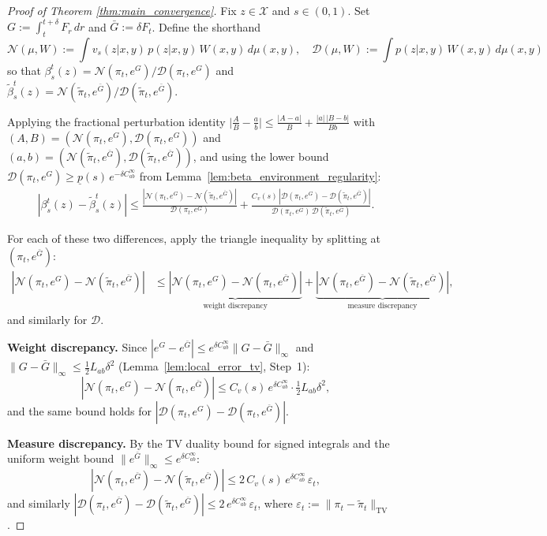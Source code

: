 \documentclass[11pt]{article}
\theoremstyle{definition}
\numberwithin{equation}{section}%
\begin{document}
\begin{proof}[Proof of Theorem \ref{thm:main_convergence}]
Fix $z \in \mathcal{X}$ and $s \in (0,1)$. Set $G := \int_t^{t+\delta} F_r\,dr$ and $\bar{G} := \delta F_t$. Define the shorthand
\[
    \mathcal{N}(\mu, W) := \int v_s(z|x,y)\,p(z|x,y)\,W(x,y)\,d\mu(x,y), \quad
    \mathcal{D}(\mu, W) := \int p(z|x,y)\,W(x,y)\,d\mu(x,y)
\]
so that $\beta_s^t(z) = \mathcal{N}(\pi_t, e^G)/\mathcal{D}(\pi_t, e^G)$ and $\tilde{\beta}_s^t(z) = \mathcal{N}(\tilde{\pi}_t, e^{\bar{G}})/\mathcal{D}(\tilde{\pi}_t, e^{\bar{G}})$.

Applying the fractional perturbation identity $\bigl|\tfrac{A}{B} - \tfrac{a}{b}\bigr| \le \tfrac{|A-a|}{B} + \tfrac{|a|\,|B-b|}{Bb}$ with
$(A,B) = (\mathcal{N}(\pi_t,e^G), \mathcal{D}(\pi_t,e^G))$ and $(a,b) = (\mathcal{N}(\tilde{\pi}_t,e^{\bar{G}}), \mathcal{D}(\tilde{\pi}_t,e^{\bar{G}}))$, and using the lower bound $\mathcal{D}(\pi_t, e^G) \ge \underline{p}(s)\,e^{-\delta C_{ab}^\infty}$ from Lemma~\ref{lem:beta_environment_regularity}:
\begin{align*}
|\beta_s^t(z) - \tilde{\beta}_s^t(z)|
\le \frac{|\mathcal{N}(\pi_t,e^G) - \mathcal{N}(\tilde{\pi}_t,e^{\bar{G}})|}{\mathcal{D}(\pi_t,e^G)}
+ \frac{C_v(s)\,|\mathcal{D}(\pi_t,e^G) - \mathcal{D}(\tilde{\pi}_t,e^{\bar{G}})|}{\mathcal{D}(\pi_t,e^G)\,\mathcal{D}(\tilde{\pi}_t,e^{\bar{G}})}.
\end{align*}

For each of these two differences, apply the triangle inequality by splitting at $(\pi_t, e^{\bar{G}})$:
\begin{align*}
|\mathcal{N}(\pi_t,e^G) - \mathcal{N}(\tilde{\pi}_t,e^{\bar{G}})| &\le
\underbrace{|\mathcal{N}(\pi_t,e^G) - \mathcal{N}(\pi_t,e^{\bar{G}})|}_{\text{weight discrepancy}} +
\underbrace{|\mathcal{N}(\pi_t,e^{\bar{G}}) - \mathcal{N}(\tilde{\pi}_t,e^{\bar{G}})|}_{\text{measure discrepancy}},
\end{align*}
and similarly for $\mathcal{D}$.

\textbf{Weight discrepancy.} Since $|e^G - e^{\bar{G}}| \le e^{\delta C_{ab}^\infty}\|G - \bar{G}\|_\infty$ and $\|G - \bar{G}\|_\infty \le \tfrac{1}{2}L_{ab}\delta^2$ (Lemma~\ref{lem:local_error_tv}, Step~1):
\[
|\mathcal{N}(\pi_t,e^G) - \mathcal{N}(\pi_t,e^{\bar{G}})| \le C_v(s)\,e^{\delta C_{ab}^\infty} \cdot \tfrac{1}{2}L_{ab}\delta^2,
\]
and the same bound holds for $|\mathcal{D}(\pi_t,e^G) - \mathcal{D}(\pi_t,e^{\bar{G}})|$.

\textbf{Measure discrepancy.} By the TV duality bound for signed integrals and the uniform weight bound $\|e^{\bar{G}}\|_\infty \le e^{\delta C_{ab}^\infty}$:
\[
|\mathcal{N}(\pi_t,e^{\bar{G}}) - \mathcal{N}(\tilde{\pi}_t,e^{\bar{G}})| \le 2\,C_v(s)\,e^{\delta C_{ab}^\infty}\,\varepsilon_t,
\]
and similarly $|\mathcal{D}(\pi_t,e^{\bar{G}}) - \mathcal{D}(\tilde{\pi}_t,e^{\bar{G}})| \le 2\,e^{\delta C_{ab}^\infty}\,\varepsilon_t$, where $\varepsilon_t := \|\pi_t - \tilde{\pi}_t\|_{\mathrm{TV}}$.


\end{proof}
\end{document}
